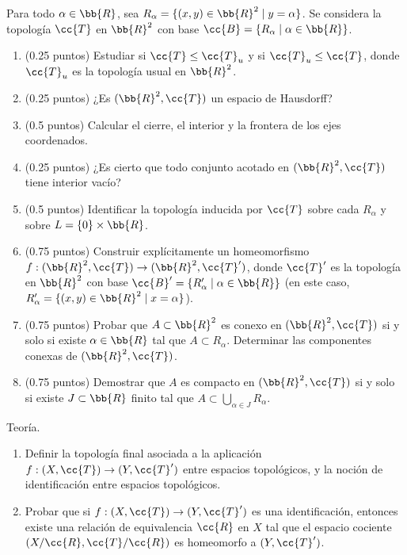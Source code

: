 \documentclass[12pt]{article}
\newcommand{\T}[0]{\cc{T}}
\begin{document}
    \begin{ejercicio}
        Para todo $\alpha \in \bb{R}$, sea $R_{\alpha}= \{(x,y)\in \bb{R}^2\mid y=\alpha\}$.
        Se considera la topología $\T$ en $\bb{R}^2$ con base $\cc{B}= \{R_{\alpha}\mid \alpha\in\bb{R}\}$.
        \begin{enumerate}
            \item(0.25 puntos) Estudiar si $\T\leq \T_u$ y si $\T_u \leq \T$, donde $\T_u$ es la topología usual en $\bb{R}^2$.
            \item(0.25 puntos) ¿Es $(\bb{R}^2,\T)$ un espacio de Hausdorff?
            \item(0.5 puntos) Calcular el cierre, el interior y la frontera de los ejes coordenados.
            \item(0.25 puntos) ¿Es cierto que todo conjunto acotado en $(\bb{R}^2,\T)$ tiene interior vacío?
            \item(0.5 puntos) Identificar la topología inducida por $\T$ sobre cada $R_{\alpha}$ y sobre $L=\{0\}\times \bb{R}$.
            \item(0.75 puntos) Construir explícitamente un homeomorfismo $f:(\bb{R}^2,\T)\to (\bb{R}^2,\T')$, donde
            $\T'$ es la topología en $\bb{R}^2$ con base $\cc{B}'= \{R'_{\alpha}\mid \alpha\in\bb{R}\}$ (en este caso, $R'_{\alpha}= \{(x,y)\in \bb{R}^2\mid x=\alpha\}$).

            \item(0.75 puntos) Probar que $A\subset \bb{R}^2$ es conexo en $(\bb{R}^2,\T)$ si y solo si existe $\alpha\in\bb{R}$ tal que $A\subset R_{\alpha}$. Determinar
            las componentes conexas de $(\bb{R}^2,\T)$.
            \item(0.75 puntos) Demostrar que $A$ es compacto en $(\bb{R}^2,\T)$ si y solo si existe $J\subset \bb{R}$ finito tal que
            $A\subset \bigcup\limits_{\alpha\in J}R_{\alpha}$.
        \end{enumerate}
    \end{ejercicio}


    \begin{ejercicio}[3 puntos] Teoría.
        \begin{enumerate}
            \item Definir la topología final asociada a la aplicación $f:(X,\T)\to (Y,\T')$ entre espacios topológicos, y la noción de identificación entre espacios topológicos.
            \item Probar que si $f:(X,\T)\to (Y,\T')$ es una identificación, entonces existe una relación de equivalencia $\cc{R}$ en $X$ tal que el espacio cociente $(X/\cc{R},\T/\cc{R})$ es homeomorfo a $(Y,\T')$.
        \end{enumerate} 
    \end{ejercicio}
\end{document}
